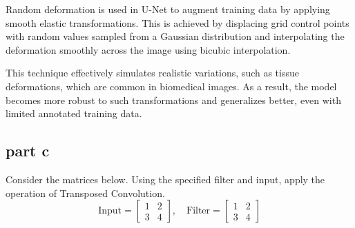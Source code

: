     \begin{qsolve}
      \begin{qsolve}[]
        Random deformation is used in U-Net to augment training data by applying smooth elastic transformations. This is achieved by displacing grid control points with random values sampled from a Gaussian distribution and interpolating the deformation smoothly across the image using bicubic interpolation.

This technique effectively simulates realistic variations, such as tissue deformations, which are common in biomedical images. As a result, the model becomes more robust to such transformations and generalizes better, even with limited annotated training data.

      \end{qsolve}
    \end{qsolve}

\subsection{part c}
Consider the matrices below. Using the specified filter and input, apply the operation of Transposed Convolution.
\[
\text{Input} = 
\begin{bmatrix}
1 & 2 \\
3 & 4
\end{bmatrix}
, \quad
\text{Filter} = 
\begin{bmatrix}
1 & 2 \\
3 & 4
\end{bmatrix}
\]

